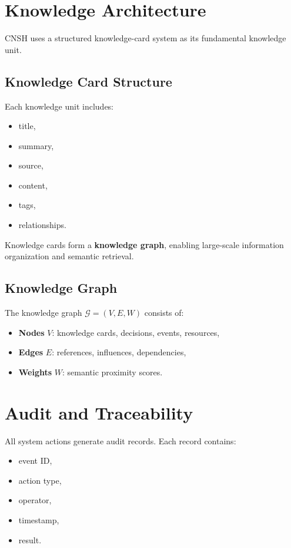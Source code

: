 \documentclass[conference]{IEEEtran}
\begin{document}
\section{Knowledge Architecture}

CNSH uses a structured knowledge-card system as its
fundamental knowledge unit.

\subsection{Knowledge Card Structure}

Each knowledge unit includes:
\begin{itemize}[nosep]
  \item title,
  \item summary,
  \item source,
  \item content,
  \item tags,
  \item relationships.
\end{itemize}

Knowledge cards form a \textbf{knowledge graph}, enabling
large-scale information organization and semantic retrieval.

\subsection{Knowledge Graph}

The knowledge graph $\mathcal{G} = (V, E, W)$ consists of:
\begin{itemize}[nosep]
  \item \textbf{Nodes} $V$: knowledge cards, decisions, events, resources,
  \item \textbf{Edges} $E$: references, influences, dependencies,
  \item \textbf{Weights} $W$: semantic proximity scores.
\end{itemize}

\section{Audit and Traceability}

All system actions generate audit records.
Each record contains:
\begin{itemize}[nosep]
  \item event ID,
  \item action type,
  \item operator,
  \item timestamp,
  \item result.
\end{itemize}
\end{document}
